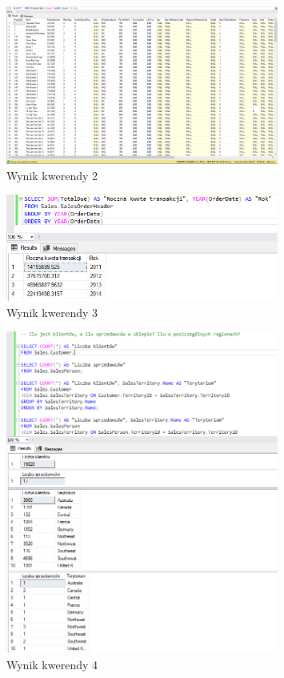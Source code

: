 \documentclass[a4paper,12pt]{article}
\begin{document}
\begin{figure}[H]
    \centering
    \includegraphics[width=0.8\textwidth]{images/02.png}
    \caption{Wynik kwerendy 2}
    \end{figure}

\begin{figure}[H]
    \centering
    \includegraphics[width=0.8\textwidth]{images/03.png}
    \caption{Wynik kwerendy 3}
    \end{figure}

\begin{figure}[H]
    \centering
    \includegraphics[width=0.8\textwidth]{images/04.png}
    \caption{Wynik kwerendy 4}
    \end{figure}
\end{document}
